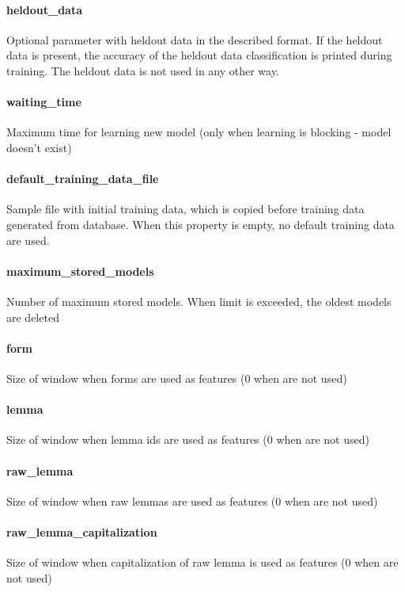 \documentclass[12pt,a4paper]{report}
\begin{document}
\paragraph{heldout\_data}
Optional parameter with heldout data in the described format. If the heldout data is present, the accuracy of the heldout data classification is printed during training. The heldout data is not used in any other way.

\paragraph{waiting\_time}
Maximum time for learning new model (only when learning is blocking - model doesn't exist)

\paragraph{default\_training\_data\_file}
Sample file with initial training data, which is copied before training data generated from database. When this property is empty, no default training data are used.

\paragraph{maximum\_stored\_models}
Number of maximum stored models. When limit is exceeded, the oldest models are deleted

\paragraph{form}
Size of window when forms are used as features (0 when are not used)

\paragraph{lemma}
Size of window when lemma ids are used as features (0 when are not used)

\paragraph{raw\_lemma}
Size of window when raw lemmas are used as features (0 when are not used)

\paragraph{raw\_lemma\_capitalization}
Size of window when capitalization of raw lemma is used as features (0 when are not used)
\end{document}
